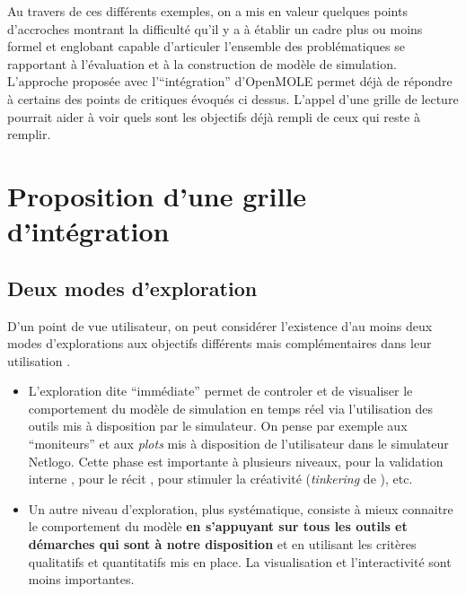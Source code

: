 Au travers de ces différents exemples, on a mis en valeur quelques points d'accroches montrant la difficulté qu'il y a à établir un cadre plus ou moins formel et englobant capable d'articuler l'ensemble des problématiques se rapportant à l'évaluation et à la construction de modèle de simulation. L'approche proposée avec l'\enquote{intégration}  d'OpenMOLE permet déjà de répondre à certains des points de critiques évoqués ci dessus. L'appel d'une grille de lecture pourrait aider à voir quels sont les objectifs déjà rempli de ceux qui reste à remplir.

\section{Proposition d'une grille d'intégration}

\subsection{Deux modes d'exploration}

D'un point de vue utilisateur, on peut considérer l'existence d'au moins deux modes d'explorations aux objectifs différents mais complémentaires dans leur utilisation \autocite[36]{Amblard2003}.

\begin{itemize}
 \item L'exploration dite \enquote{immédiate} permet de controler et de visualiser le comportement du modèle de simulation en temps réel via l'utilisation des outils mis à disposition par le simulateur. On pense par exemple aux \enquote{moniteurs} et aux \textit{plots}  mis à disposition de l'utilisateur dans le simulateur Netlogo. Cette phase est importante à plusieurs niveaux, pour la validation interne \autocite{Amblard2006} , pour le récit \autocites{Millington2012,OSullivan2004}, pour stimuler la créativité (\textit{tinkering} de \autocite{Resnick2013}), etc.  
 \item Un autre niveau d'exploration, plus systématique, consiste à mieux connaitre le comportement du modèle \textbf{en s'appuyant sur tous les outils et démarches qui sont à notre disposition} et en utilisant les critères qualitatifs et quantitatifs mis en place. La visualisation et l'interactivité sont moins importantes. 
\end{itemize}

